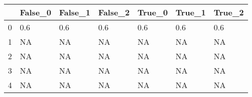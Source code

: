 \begin{tabular}{lllllll}
\toprule
{} & False\_0 & False\_1 & False\_2 & True\_0 & True\_1 & True\_2 \\ \hline
\midrule
0 &     0.6 &     0.6 &     0.6 &    0.6 &    0.6 &    0.6 \\ \hline
1 &      NA &      NA &      NA &     NA &     NA &     NA \\ \hline
2 &      NA &      NA &      NA &     NA &     NA &     NA \\ \hline
3 &      NA &      NA &      NA &     NA &     NA &     NA \\ \hline
4 &      NA &      NA &      NA &     NA &     NA &     NA \\ \hline
\bottomrule
\end{tabular}
